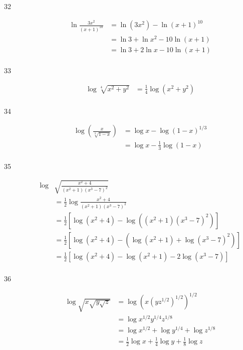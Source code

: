 \documentclass{exam}
\begin{document}
\begin{description}
      \item[32] 
        \begin{align*}
          \ln \frac{3x^2}{(x + 1)^{10}} &= \ln \left( 3x^2 \right) - \ln (x + 1)^{10} \\
                                        &= \ln 3 + \ln x^2 - 10 \ln (x + 1) \\
                                        &= \ln 3 + 2 \ln x - 10 \ln (x + 1) \\
        \end{align*}

      \item[33] 
        \begin{align*}
          \log \sqrt[4]{x^2 + y^2} &= \frac{1}{4} \log \left( x^2 + y^2 \right) \\
        \end{align*}

      \item[34] 
        \begin{align*}
          \log \left( \frac{x} {\sqrt[3]{1 - x}} \right) &= \log x - \log (1 - x)^{1/3} \\
                                                         &= \log x - \frac{1}{3} \log (1 - x) \\
        \end{align*}

      \item[35] 
        \begin{align*}
          \log & \sqrt{ \frac{x^2 + 4}{( x^2 + 1 ) ( x^3 - 7 )^2}}  \\
               &= \frac{1}{2} \log \frac{x^2 + 4}{( x^2 + 1 ) ( x^3 - 7 )^2} \\
               &= \frac{1}{2} \left[ \log ( x^2 + 4 ) - \log (  ( x^2 + 1 ) ( x^3 - 7 )^2 ) \right] \\
               &= \frac{1}{2} \left[ \log ( x^2 + 4 ) - (\log ( x^2 + 1 ) + \log ( x^3 - 7 )^2 ) \right]  \\
               &= \frac{1}{2} \left[ \log ( x^2 + 4 ) - \log ( x^2 + 1 ) - 2 \log ( x^3 - 7 ) \right] \\
        \end{align*}

      \item[36] 
        \begin{align*}
          \log \sqrt{x \sqrt{y \sqrt{z}}} &= \log (x (y z^{1/2})^{1/2})^{1/2} \\
                                          &= \log x^{1/2}y^{1/4}z^{1/8} \\
                                          &= \log x^{1/2} + \log y^{1/4} + \log z^{1/8} \\
                                          &= \frac{1}{2} \log x + \frac{1}{4} \log y + \frac{1}{8} \log z  \\
        \end{align*}


\end{description}
\end{document}
